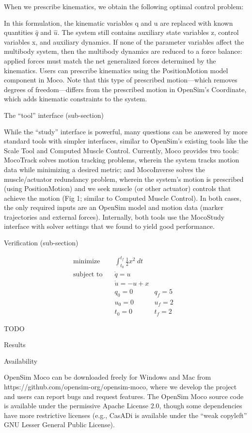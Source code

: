 \documentclass[10pt,letterpaper]{article}
\newcommand{\analytic}{
\begin{equation}
    \begin{aligned}
        \mbox{minimize}
         \quad & \int_{t_0}^{t_f} \frac{1}{2}x^2~dt &&  \\
         \mbox{subject to}
         \quad & \dot{q} = u \\
         & \dot{u} = -u + x \\
         & q_0 = 0 & q_f = 5 \\
         & u_0 = 0 & u_f = 2\\
         & t_0 = 0 & t_f = 2
    \end{aligned}
\end{equation}
}
\begin{document}
When we prescribe kinematics, we obtain the following optimal control problem:

In this formulation, the kinematic variables q and u are replaced with known quantities $\hat{q}$ and $\hat{u}$. The system still contains auxiliary state variables z, control variables x, and auxiliary dynamics. If none of the parameter variables affect the multibody system, then the multibody dynamics are reduced to a force balance: applied forces must match the net generalized forces determined by the kinematics. Users can prescribe kinematics using the PositionMotion model component in Moco. Note that this type of prescribed motion—which removes degrees of freedom—differs from the prescribed motion in OpenSim’s Coordinate, which adds kinematic constraints to the system.

The “tool” interface (sub-section)

While the “study” interface is powerful, many questions can be answered by more standard tools with simpler interfaces, similar to OpenSim’s existing tools like the Scale Tool and Computed Muscle Control. Currently, Moco provides two tools: MocoTrack solves motion tracking problems, wherein the system tracks motion data while minimizing a desired metric; and MocoInverse solves the muscle/actuator redundancy problem, wherein the system’s motion is prescribed (using PositionMotion) and we seek muscle (or other actuator) controls that achieve the motion (Fig 1; similar to Computed Muscle Control). In both cases, the only required inputs are an OpenSim model and motion data (marker trajectories and external forces). Internally, both tools use the MocoStudy interface with solver settings that we found to yield good performance.

Verification (sub-section)

\analytic

TODO

Results



Availability

OpenSim Moco can be downloaded freely for Windows and Mac from https://github.com/opensim-org/opensim-moco, where we develop the project and users can report bugs and request features. The OpenSim Moco source code is available under the permissive Apache License 2.0, though some dependencies have more restrictive licenses (e.g., CasADi is available under the “weak copyleft” GNU Lesser General Public License).
\end{document}
